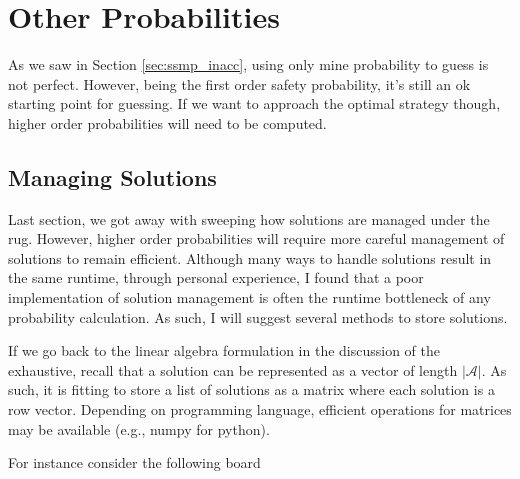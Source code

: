\section{Other Probabilities}

As we saw in Section \ref{sec:ssmp_inacc}, using only mine probability to guess is not perfect. However, being the first order safety probability, it's still an ok starting point for guessing. If we want to approach the optimal strategy though, higher order probabilities will need to be computed.

\subsection{Managing Solutions}

Last section, we got away with sweeping how solutions are managed under the rug. However, higher order probabilities will require more careful management of solutions to remain efficient. Although many ways to handle solutions result in the same runtime, through personal experience, I found that a poor implementation of solution management is often the runtime bottleneck of any probability calculation. As such, I will suggest several methods to store solutions.

If we go back to the linear algebra formulation in the discussion of the exhaustive, recall that a solution can be represented as a vector of length $|\mathcal{A}|$. As such, it is fitting to store a list of solutions as a matrix where each solution is a row vector. Depending on programming language, efficient operations for matrices may be available (e.g., numpy for python).

For instance consider the following board
\begin{center}
    \begin{minipage}{0.25\linewidth}\centering{}\end{minipage}
\end{center}

